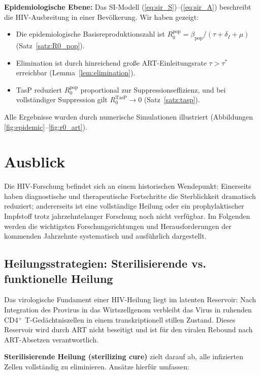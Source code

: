 ﻿\documentclass[a4paper,12pt]{article}
\theoremstyle{definition}
\begin{document}
\textbf{Epidemiologische Ebene:} Das SI-Modell (\ref{eq:sir_S})--(\ref{eq:sir_A}) beschreibt
die HIV-Ausbreitung in einer Bev\"olkerung. Wir haben gezeigt:
\begin{itemize}
\item Die epidemiologische Basisreproduktionszahl ist $R_0^{\text{pop}} = \beta_{\text{pop}} / (\tau + \delta_I + \mu)$
      (Satz~\ref{satz:R0_pop}).
\item Elimination ist durch hinreichend gro\ss e ART-Einleitungsrate $\tau > \tau^*$ erreichbar
      (Lemma~\ref{lem:elimination}).
\item TasP reduziert $R_0^{\text{pop}}$ proportional zur Suppressionseffizienz, und bei
      vollst\"andiger Suppression gilt $R_0^{\text{TasP}} \to 0$ (Satz~\ref{satz:tasp}).
\end{itemize}

Alle Ergebnisse wurden durch numerische Simulationen illustriert (Abbildungen
\ref{fig:epidemic}--\ref{fig:r0_art}).

\section{Ausblick}

Die HIV-Forschung befindet sich an einem historischen Wendepunkt: Einerseits haben
diagnostische und therapeutische Fortschritte die Sterblichkeit dramatisch reduziert;
andererseits ist eine vollst\"andige Heilung oder ein prophylaktischer Impfstoff
trotz jahrzehntelanger Forschung noch nicht verf\"ugbar. Im Folgenden werden die
wichtigsten Forschungsrichtungen und Herausforderungen der kommenden Jahrzehnte
systematisch und ausf\"uhrlich dargestellt.

\subsection{Heilungsstrategien: Sterilisierende vs. funktionelle Heilung}

Das virologische Fundament einer HIV-Heilung liegt im latenten Reservoir: Nach
Integration des Provirus in das Wirtszellgenom verbleibt das Virus in ruhenden
CD4$^+$ T-Ged\"achtniszellen in einem transkriptionell stillen Zustand.
Dieses Reservoir wird durch ART nicht beseitigt und ist f\"ur den viralen Rebound
nach ART-Absetzen verantwortlich.

\textbf{Sterilisierende Heilung (sterilizing cure)} zielt darauf ab, alle infizierten
Zellen vollst\"andig zu eliminieren. Ansätze hierfür umfassen:
\end{document}
